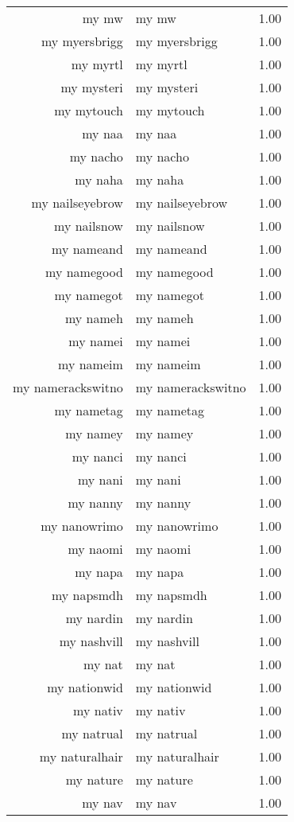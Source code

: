 \begin{table}[ht]
\begin{tabular}{rlr}
  my mw & my mw & 1.00 \\ 
  my myersbrigg & my myersbrigg & 1.00 \\ 
  my myrtl & my myrtl & 1.00 \\ 
  my mysteri & my mysteri & 1.00 \\ 
  my mytouch & my mytouch & 1.00 \\ 
  my naa & my naa & 1.00 \\ 
  my nacho & my nacho & 1.00 \\ 
  my naha & my naha & 1.00 \\ 
  my nailseyebrow & my nailseyebrow & 1.00 \\ 
  my nailsnow & my nailsnow & 1.00 \\ 
  my nameand & my nameand & 1.00 \\ 
  my namegood & my namegood & 1.00 \\ 
  my namegot & my namegot & 1.00 \\ 
  my nameh & my nameh & 1.00 \\ 
  my namei & my namei & 1.00 \\ 
  my nameim & my nameim & 1.00 \\ 
  my namerackswitno & my namerackswitno & 1.00 \\ 
  my nametag & my nametag & 1.00 \\ 
  my namey & my namey & 1.00 \\ 
  my nanci & my nanci & 1.00 \\ 
  my nani & my nani & 1.00 \\ 
  my nanny & my nanny & 1.00 \\ 
  my nanowrimo & my nanowrimo & 1.00 \\ 
  my naomi & my naomi & 1.00 \\ 
  my napa & my napa & 1.00 \\ 
  my napsmdh & my napsmdh & 1.00 \\ 
  my nardin & my nardin & 1.00 \\ 
  my nashvill & my nashvill & 1.00 \\ 
  my nat & my nat & 1.00 \\ 
  my nationwid & my nationwid & 1.00 \\ 
  my nativ & my nativ & 1.00 \\ 
  my natrual & my natrual & 1.00 \\ 
  my naturalhair & my naturalhair & 1.00 \\ 
  my nature & my nature & 1.00 \\ 
  my nav & my nav & 1.00 \\ 

\end{tabular}
\end{table}
